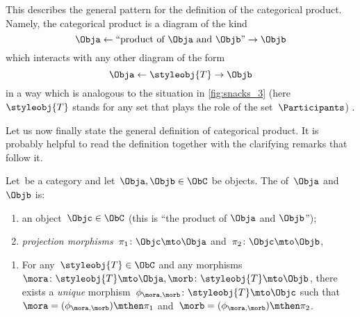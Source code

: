 This describes the general pattern for the definition of the categorical product.
Namely, the categorical product is a diagram of the kind
\begin{equation}
	\label{eq:prod-inline-generic-diagram}
	\Obja \leftarrow \text{``product of } \Obja \text{ and } \Objb \text{''}  \rightarrow \Objb
\end{equation}
which interacts with any other diagram of the form
\begin{equation}
	\label{eq:prod-inline-test-diagram}
	\Obja \leftarrow \styleobj{T} \rightarrow \Objb
\end{equation}
in a way which is analogous to the situation in \cref{fig:snacks_3} (here~$\styleobj{T}$ stands for any set that plays the role of the set~$\Participants$) .

Let us now finally state the general definition of categorical product.
It is probably helpful to read the definition together with the clarifying remarks that follow it.


\begin{ctdefinition}
	\label{def:categorical-product}
	Let~\CatC be a category and let~$\Obja, \Objb \in \ObC$ be objects.
	The \emph{} of~$\Obja$ and~$\Objb$ is: \\
	\constit
	\begin{enumerate}
		\item an object~$\Objc \in \ObC$ (this is ``the product of $\Obja$  and $\Objb$'');
		\item \emph{projection morphisms}~$\pi_1 \colon \Objc \mto \Obja$ and~$\pi_2 \colon \Objc \mto \Objb$,
	\end{enumerate}
	\condit
	\begin{enumerate}
		\item For any~$\styleobj{T} \in \ObC$ and any morphisms~$\mora \colon \styleobj{T} \mto \Obja, \morb \colon \styleobj{T} \mto \Objb$, there exists a \emph{unique} morphism~$\phi_{\mora,\morb} \colon \styleobj{T} \mto \Objc$ such that~$\mora = (\phi_{\mora,
				      \morb})\mthen \pi_1$ and~$\morb=(\phi_{\mora, \morb})\mthen \pi_2$.
	\end{enumerate}
\end{ctdefinition}

\begin{marginfigure}
	\centering
	\caption{}
	\label{fig:prod-def-diagram}
\end{marginfigure}

